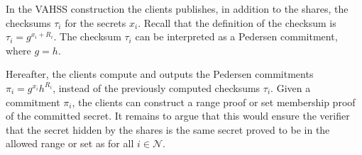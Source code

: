 

In the VAHSS construction the clients publishes, in addition to the shares,  the checksums $\tau_i$ for the secrets $x_i$. Recall that the definition of the checksum is  $\tau_i=g^{x_i+R_i}$. The checksum $\tau_i$ can be interpreted as a Pedersen commitment, where $g=h$.

Hereafter, the clients compute and outputs the Pedersen commitments $\pi_i=g^{x_i}h^{R_i}$, instead of the previously computed checksums $\tau_i$.  Given a commitment $\pi_i$, the clients can construct a range proof or set membership proof of the committed secret. It remains to argue that this would ensure the verifier that the secret hidden by the shares is the same secret proved to be in the allowed range or set as for all $i\in\mathcal{N}$.



